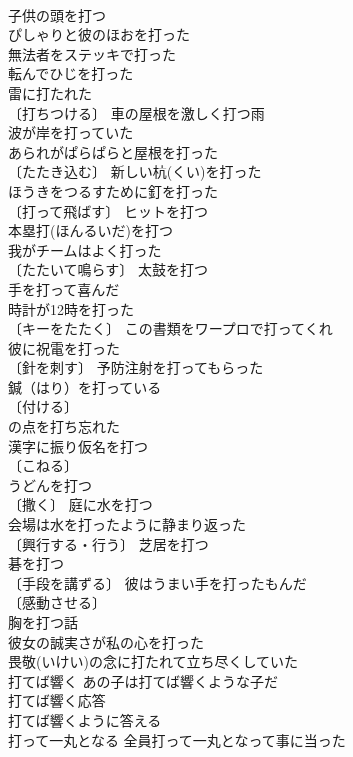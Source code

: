 \documentclass[8pt]{extreport}
\begin{document}
\begin{CJK}{UTF8}{min}
\\	子供の頭を打つ 
\\	ぴしゃりと彼のほおを打った 
\\	無法者をステッキで打った 
\\	転んでひじを打った 
\\	雷に打たれた 
\\	〔打ちつける〕 車の屋根を激しく打つ雨 
\\	波が岸を打っていた 
\\	あられがぱらぱらと屋根を打った 
\\	〔たたき込む〕 新しい杭(くい)を打った 
\\	ほうきをつるすために釘を打った 
\\	〔打って飛ばす〕 ヒットを打つ 
\\	本塁打(ほんるいだ)を打つ 
\\	我がチームはよく打った 
\\	〔たたいて鳴らす〕 太鼓を打つ 
\\	手を打って喜んだ 
\\	時計が12時を打った 
\\	〔キーをたたく〕 この書類をワープロで打ってくれ 
\\	彼に祝電を打った 
\\	〔針を刺す〕 予防注射を打ってもらった 
\\	鍼（はり）を打っている 
\\	〔付ける〕 
\\	の点を打ち忘れた 
\\	漢字に振り仮名を打つ 
\\	〔こねる〕
\\	うどんを打つ 
\\	〔撒く〕 庭に水を打つ 
\\	会場は水を打ったように静まり返った 
\\	〔興行する・行う〕 芝居を打つ 
\\	碁を打つ 
\\	〔手段を講ずる〕 彼はうまい手を打ったもんだ 
\\	〔感動させる〕
\\	胸を打つ話 
\\	彼女の誠実さが私の心を打った 
\\	畏敬(いけい)の念に打たれて立ち尽くしていた 
\\	打てば響く あの子は打てば響くような子だ 
\\	打てば響く応答 
\\	打てば響くように答える 
\\	打って一丸となる 全員打って一丸となって事に当った 

\end{CJK}
\end{document}
